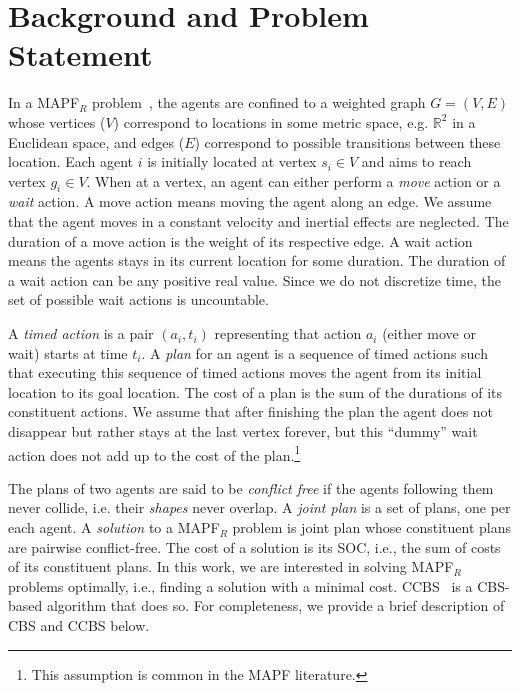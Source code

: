 \documentclass[letterpaper]{article} %
\newcommand{\cbs}{\ac{CBS}\xspace}
\newcommand{\ccbs}{\ac{CCBS}\xspace}
\newcommand{\soc}{\ac{SOC}\xspace}
\newcommand{\mapfr}{{MAPF}$_R$\xspace}
\begin{document}
\section{Background and Problem Statement}

In a \mapfr problem~\cite{walker2018extended}, the agents are confined to a weighted graph $G=(V, E)$ whose vertices ($V$) correspond to locations in some metric space, e.g. $\mathbb{R}^2$ in a Euclidean space, and edges ($E$) correspond to possible transitions between these location. 
Each agent $i$ is initially located at vertex $s_i\in V$ and aims to reach vertex $g_i\in V$. 
When at a vertex, an agent can either perform a \emph{move} action or a \emph{wait} action. 
A move action means moving the agent along an edge. 
We assume that the agent moves in a constant velocity and inertial effects are neglected. 
The duration of a move action is the weight of its respective edge. 
A wait action means the agents stays in its current location for some duration. 
The duration of a wait action can be any positive real value. Since we do not discretize time, the set of possible wait actions is uncountable. 

A \emph{timed action} is a pair $(a_i, t_i)$ representing that action $a_i$ (either move or wait) starts at time $t_i$. 
A \emph{plan} for an agent is a sequence of timed actions such that executing this sequence of timed actions moves the agent from its initial location to its goal location. 
The cost of a plan is the sum of the durations of its constituent actions. 
We assume that after finishing the plan the agent does not disappear but rather stays at the last vertex forever, but this ``dummy'' wait action does not add up to the cost of the plan.\footnote{This assumption is common in the MAPF literature.}

The plans of two agents are said to be \emph{conflict free} if the agents following them never collide, i.e. their \emph{shapes} never overlap. 
A \emph{joint plan} is a set of plans, one per each agent. 
A \emph{solution} to a \mapfr problem is joint plan whose constituent plans are pairwise conflict-free. 
The cost of a solution is its \soc, i.e., the sum of costs of its constituent plans.  
In this work, we are interested in solving \mapfr problems optimally, i.e., finding a  solution with a minimal cost. 
\ccbs~\cite{andreychuk2019multi} is a \cbs-based algorithm that does so. 
For completeness, we provide a brief description of \cbs and \ccbs below. 
\end{document}
